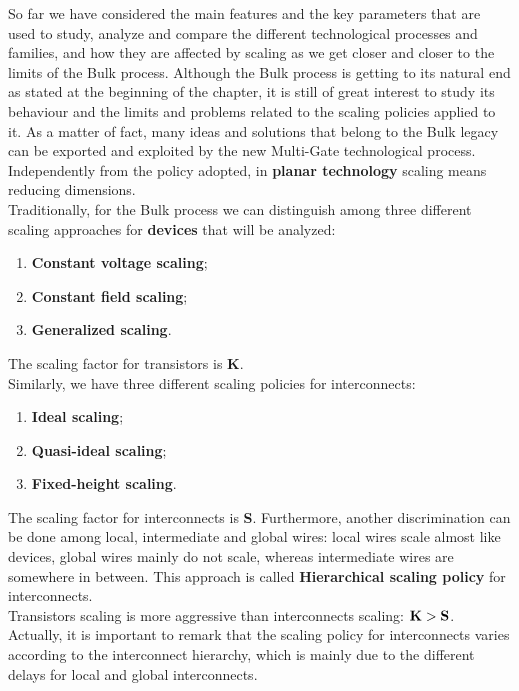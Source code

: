 \documentclass[a4paper, 12pt, twoside, openright]{report}
\begin{document}
{So far we have considered the main features and the key parameters that are used to study, analyze and compare the different technological processes and families, and how they are affected by scaling as we get closer and closer to the limits of the Bulk process. Although the Bulk process is getting to its natural end as stated at the beginning of the chapter, it is still of great interest to study its behaviour and the limits and problems related to the scaling policies applied to it. As a matter of fact, many ideas and solutions that belong to the Bulk legacy can be exported and exploited by the new Multi-Gate technological process. Independently from the policy adopted, in \textbf{planar technology} scaling means reducing dimensions.\\
Traditionally, for the Bulk process we can distinguish among three different scaling approaches for \textbf{devices} that will be analyzed:

\begin{enumerate}
\item \textbf{Constant voltage scaling};
\item \textbf{Constant field scaling};
\item \textbf{Generalized scaling}.
\end{enumerate}

The scaling factor for transistors is \textbf{K}.\\
Similarly, we have three different scaling policies for interconnects: 

\begin{enumerate}
\item \textbf{Ideal scaling};
\item \textbf{Quasi-ideal scaling};
\item \textbf{Fixed-height scaling}.
\end{enumerate}

The scaling factor for interconnects is \textbf{S}. Furthermore, another discrimination can be done among local, intermediate and global wires: local wires scale almost like devices, global wires mainly do not scale, whereas intermediate wires are somewhere in between. This approach is called \textbf{Hierarchical scaling policy} for interconnects.\\
Transistors scaling is more aggressive than interconnects scaling: $\text{\textbf{K}} > \text{\textbf{S}}$. Actually, it is important to remark that the scaling policy for interconnects varies according to the interconnect hierarchy, which is mainly due to the different delays for local and global interconnects.

}
\end{document}
